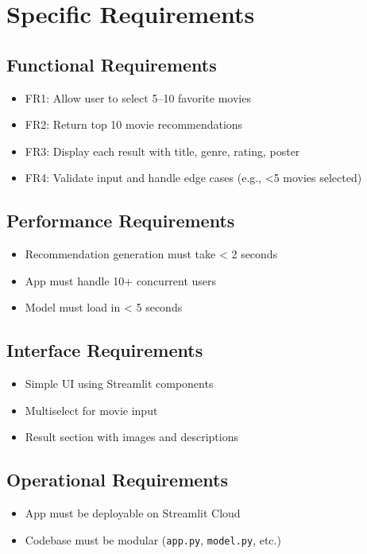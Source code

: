 \documentclass{article}
\begin{document}
\section{Specific Requirements}

\subsection{Functional Requirements}
\begin{itemize}
    \item FR1: Allow user to select 5–10 favorite movies
    \item FR2: Return top 10 movie recommendations
    \item FR3: Display each result with title, genre, rating, poster
    \item FR4: Validate input and handle edge cases (e.g., <5 movies selected)
\end{itemize}

\subsection{Performance Requirements}
\begin{itemize}
    \item Recommendation generation must take < 2 seconds
    \item App must handle 10+ concurrent users
    \item Model must load in < 5 seconds
\end{itemize}

\subsection{Interface Requirements}
\begin{itemize}
    \item Simple UI using Streamlit components
    \item Multiselect for movie input
    \item Result section with images and descriptions
\end{itemize}

\subsection{Operational Requirements}
\begin{itemize}
    \item App must be deployable on Streamlit Cloud
    \item Codebase must be modular (\texttt{app.py}, \texttt{model.py}, etc.)
\end{itemize}
\end{document}
